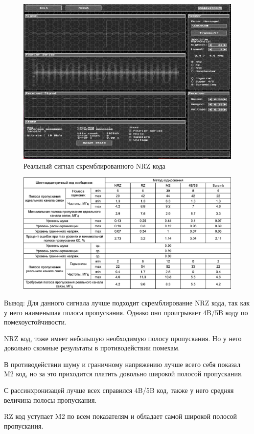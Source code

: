 \documentclass[12pt,onecolumn]{article}
\begin{document}
\begin{figure}[H]
    \centering
    \includegraphics[width=\textwidth]{image/nf-5.png}
    \caption{Реальный сигнал скремблированного NRZ кода}
\end{figure}
\begin{figure}[H]
    \centering
    \includegraphics[width=\textwidth]{image/table4.png}
\end{figure}

Вывод:
Для данного сигнала лучше подходит скремблирование NRZ кода, так как у него наименьшая полоса пропускания. Однако оно проигрывает 4B/5B коду по помехоустойчивости.

NRZ код, тоже имеет небольшую необходимую полосу пропускания. Но у него довольно скомные результаты в противодействии помехам.

В противодействии шуму и граничному напряжению лучше всего себя показал M2 код, но за это приходится платить довольно широкой полосой пропускания.

С рассинхронизацей лучше всех справился 4B/5B код, также у него средняя величина полосы пропускания.

RZ код уступает M2 по всем показателям и обладает самой широкой полосой пропускания.
\end{document}
